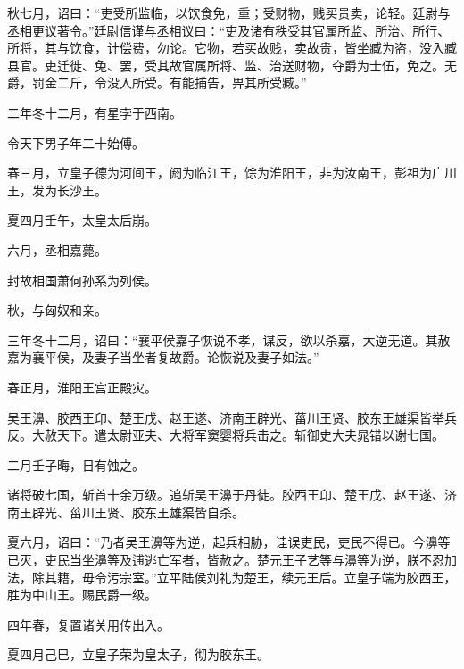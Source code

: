 \documentclass[12pt,UTF8]{ctexbook}
\begin{document}
秋七月，诏曰：“吏受所监临，以饮食免，重；受财物，贱买贵卖，论轻。廷尉与丞相更议著令。”廷尉信谨与丞相议曰：“吏及诸有秩受其官属所监、所治、所行、所将，其与饮食，计偿费，勿论。它物，若买故贱，卖故贵，皆坐臧为盗，没入臧县官。吏迁徙、兔、罢，受其故官属所将、监、治送财物，夺爵为士伍，免之。无爵，罚金二斤，令没入所受。有能捕告，畀其所受臧。”



二年冬十二月，有星孛于西南。



令天下男子年二十始傅。



春三月，立皇子德为河间王，阏为临江王，馀为淮阳王，非为汝南王，彭祖为广川王，发为长沙王。



夏四月壬午，太皇太后崩。



六月，丞相嘉薨。



封故相国萧何孙系为列侯。



秋，与匈奴和亲。



三年冬十二月，诏曰：“襄平侯嘉子恢说不孝，谋反，欲以杀嘉，大逆无道。其赦嘉为襄平侯，及妻子当坐者复故爵。论恢说及妻子如法。”



春正月，淮阳王宫正殿灾。



吴王濞、胶西王卬、楚王戊、赵王遂、济南王辟光、菑川王贤、胶东王雄渠皆举兵反。大赦天下。遣太尉亚夫、大将军窦婴将兵击之。斩御史大夫晁错以谢七国。



二月壬子晦，日有蚀之。



诸将破七国，斩首十余万级。追斩吴王濞于丹徒。胶西王卬、楚王戊、赵王遂、济南王辟光、菑川王贤、胶东王雄渠皆自杀。



夏六月，诏曰：“乃者吴王濞等为逆，起兵相胁，诖误吏民，吏民不得已。今濞等已灭，吏民当坐濞等及逋逃亡军者，皆赦之。楚元王子艺等与濞等为逆，朕不忍加法，除其籍，毋令污宗室。”立平陆侯刘礼为楚王，续元王后。立皇子端为胶西王，胜为中山王。赐民爵一级。



四年春，复置诸关用传出入。



夏四月己巳，立皇子荣为皇太子，彻为胶东王。
\end{document}
